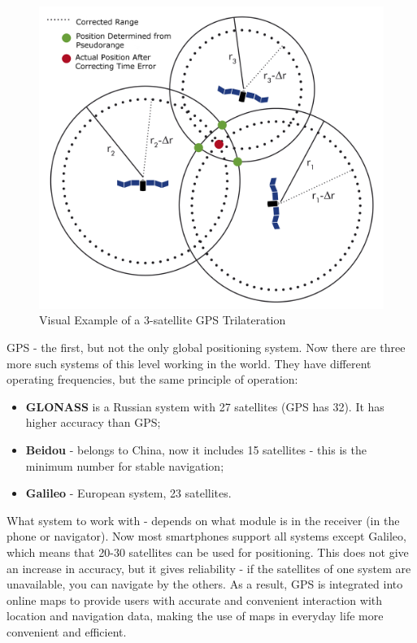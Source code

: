 \documentclass[10pt,oneside,english,a4paper]{article}
\begin{document}
\begin{figure}[h]
	\centering
	\includegraphics[scale=0.07]{diagram3.png}
	\caption{Visual Example of a 3-satellite GPS Trilateration \cite{Olson2018}}
	\label{fig:trilateration}
\end{figure}

GPS - the first, but not the only global positioning system. Now there are three more such systems of this level working in the world. They have different operating frequencies, but the same principle of operation:

\begin{itemize}
\item \textbf{GLONASS} is a Russian system with 27 satellites (GPS has 32). It has higher accuracy than GPS;
\item \textbf{Beidou} - belongs to China, now it includes 15 satellites - this is the minimum number for stable navigation;
\item \textbf{Galileo} - European system, 23 satellites.
\end{itemize}

What system to work with - depends on what module is in the receiver (in the phone or navigator). Now most smartphones support all systems except Galileo, which means that 20-30 satellites can be used for positioning. This does not give an increase in accuracy, but it gives reliability - if the satellites of one system are unavailable, you can navigate by the others. As a result, GPS is integrated into online maps to provide users with accurate and convenient interaction with location and navigation data, making the use of maps in everyday life more convenient and efficient.
\end{document}
